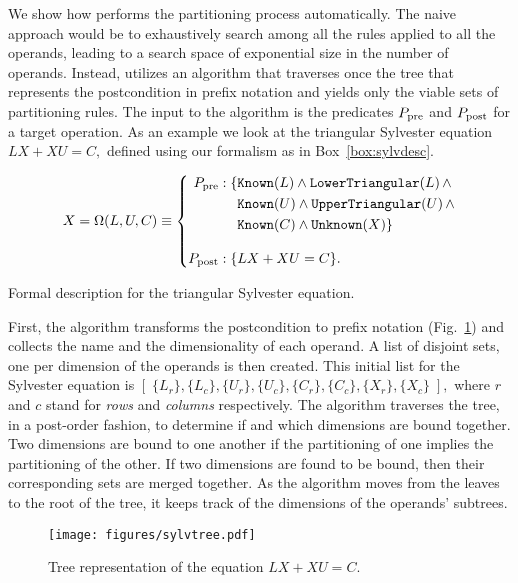 \documentclass{llncs}
\newcommand{\click}{{\sc{Cl\makebox[.58\width][c]{1}ck}}}
\newcommand{\prop}[2]{{\tt{#1(}}#2{\tt{)}}}
\begin{document}
We show how \click{} performs the partitioning process automatically.
The naive approach would be to exhaustively search among all the
rules applied to all the operands, leading to a search space of
exponential size in the number of operands. 
Instead, \click{} utilizes an algorithm that traverses once the tree
that represents the postcondition in prefix notation and yields only
the viable sets of partitioning rules. 
The input to the algorithm is the predicates $P_{\rm pre}$ and $P_{\rm{post}}$ for a target operation.
As an example we look at the triangular Sylvester equation
$L X + X U = C,$
defined using our formalism as in Box~\ref{box:sylvdesc}.

\begin{mybox}
{\small
\begin{equation} \nonumber
X= \Omega(L, U, C) \equiv
\left\{
\begin{split}
P_{\rm pre}: \{ & \prop{Known}{L} \wedge \prop{LowerTriangular}{L} \, \wedge \\
            & \prop{Known}{U} \wedge \prop{UpperTriangular}{U} \, \wedge \\
            & \prop{Known}{C} \wedge \prop{Unknown}{X} \} \\
\\[-2mm]
P_{\rm post}: \{ &  L X + X U = C \}.
\end{split}
\right.
\end{equation}
}
\caption{Formal description for the triangular Sylvester equation.}
\label{box:sylvdesc}
\end{mybox}

First, the algorithm transforms the postcondition to prefix notation
(Fig.~\ref{fig:tree}) and collects the name and the dimensionality of each operand. 
A list of disjoint sets, one per dimension of the operands is then
created.
This initial list for the Sylvester equation is
$\left[ \; \{ L_{r}\}, \{ L_{c}\}, \{ U_{r}\}, \{ U_{c}\}, \{ C_{r}\}, \{ C_{c}\}, \{ X_{r}\}, \{ X_{c}\} \; \right],$
where $r$ and $c$ stand for {\it rows} and {\it columns} respectively.
The algorithm traverses the tree, in a post-order fashion, to
determine if and which dimensions are bound together. Two dimensions
are bound to one another if the partitioning of one implies the
partitioning of the other. 
If two dimensions are found to be bound, then their corresponding
sets are merged together. As the algorithm moves from the leaves to
the root of the tree, it keeps track of the dimensions of the operands'
subtrees.

\begin{figure}
\begin{center}
\texttt{[image: figures/sylvtree.pdf]}
\caption{Tree representation of the equation $L X + X U = C$.} \label{fig:tree}
\end{center}
\end{figure}
\end{document}
